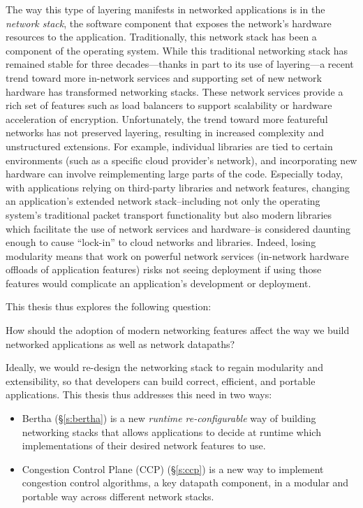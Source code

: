 The way this type of layering manifests in networked applications is in the \emph{network stack}, the software component that exposes the network's hardware resources to the application. Traditionally, this network stack has been a component of the operating system.
While this traditional networking stack has remained stable for three decades---thanks in part to its use of layering---a recent trend toward more in-network services and supporting set of new network hardware has transformed networking stacks. 
These network services provide a rich set of features such as load balancers to support scalability or hardware acceleration of encryption. 
Unfortunately, the trend toward more featureful networks has not preserved layering, resulting in increased complexity and unstructured extensions.
For example, individual libraries are tied to certain environments (such as a specific cloud provider's network), and incorporating new hardware can involve reimplementing large parts of the code. 
Especially today, with applications relying on third-party libraries and network features, changing an application's extended network stack--including not only the operating system's traditional packet transport functionality but also modern libraries which facilitate the use of network services and hardware--is considered daunting enough to cause ``lock-in'' to cloud networks and libraries.
Indeed, losing modularity means that work on powerful network services (\eg in-network hardware offloads of application features) risks not seeing deployment if using those features would complicate an application's development or deployment. 

This thesis thus explores the following question:

\begin{displayquote}
How should the adoption of modern networking features affect the way we build networked applications as well as network datapaths?
\end{displayquote}
\noindent
Ideally, we would re-design the networking stack to regain modularity and extensibility, so that developers can build correct, efficient, and portable applications.
This thesis thus addresses this need in two ways:

\begin{itemize}
  \item Bertha (\S\ref{s:bertha}) is a new \emph{runtime re-configurable} way of building networking stacks that allows applications to decide at runtime which implementations of their desired network features to use. 
  \item Congestion Control Plane (CCP) (\S\ref{s:ccp}) is a new way to implement congestion control algorithms, a key datapath component, in a modular and portable way across different network stacks.
\end{itemize}

